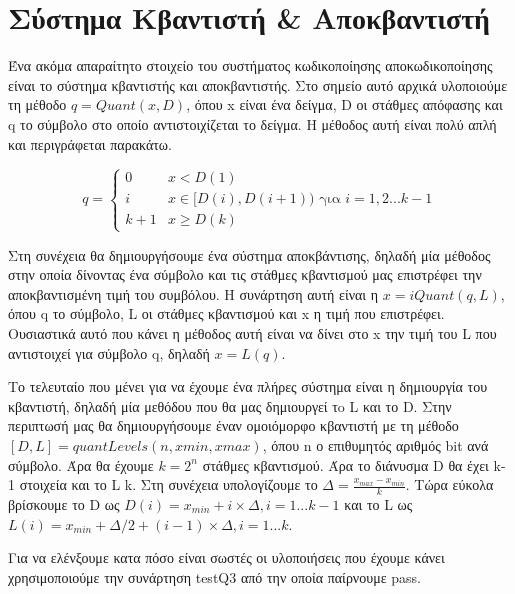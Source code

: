 \section{Σύστημα Κβαντιστή \& Αποκβαντιστή}

\par Ένα ακόμα απαραίτητο στοιχείο του συστήματος κωδικοποίησης αποκωδικοποίησης
είναι το σύστημα κβαντιστής και αποκβαντιστής. Στο σημείο αυτό αρχικά υλοποιούμε
τη μέθοδο $q = Quant(x, D)$, όπου x είναι ένα δείγμα, D οι στάθμες απόφασης και q
το σύμβολο στο οποίο αντιστοιχίζεται το δείγμα. Η μέθοδος αυτή είναι πολύ απλή και
περιγράφεται παρακάτω.


\begin{equation}
q =
\begin{cases}
0  &    x < D(1) \\
i  & x\in[D(i), D(i+1)) \mbox{ για }  i = 1,2...k-1 \\
k+1 & x \geq D(k)
\end{cases}
\end{equation}

\par Στη συνέχεια θα δημιουργήσουμε ένα σύστημα αποκβάντισης, δηλαδή μία μέθοδος
στην οποία δίνοντας ένα σύμβολο και τις στάθμες κβαντισμού μας επιστρέφει την
αποκβαντισμένη τιμή του συμβόλου. Η συνάρτηση αυτή είναι η $x = iQuant(q, L)$, όπου
q το σύμβολο, L οι στάθμες κβαντισμού και x η τιμή που επιστρέφει. Ουσιαστικά αυτό
που κάνει η μέθοδος αυτή είναι να δίνει στο x την τιμή του L που αντιστοιχεί για
σύμβολο q, δηλαδή $x = L(q)$.

\par Το τελευταίο που μένει για να έχουμε ένα πλήρες σύστημα είναι η δημιουργία
του κβαντιστή, δηλαδή μία μεθόδου που θα μας δημιουργεί τo L και το D. Στην
περιπτωσή μας θα δημιουργήσουμε έναν ομοιόμορφο κβαντιστή με τη μέθοδο $[D, L] =
quantLevels(n, xmin, xmax)$, όπου n ο επιθυμητός αριθμός bit ανά σύμβολο. Άρα
θα έχουμε $k = 2^n$ στάθμες κβαντισμού. Άρα το διάνυσμα D θα έχει k-1 στοιχεία
και το L k. Στη συνέχεια υπολογίζουμε το $\Delta = \frac{x_{max}-x_{min}}{k}$.
Τώρα εύκολα βρίσκουμε το D ως $D(i)=x_{min}+i \times \Delta, i=1...k-1$ και το
L ως $L(i) = x_{min} + \Delta/2 + (i-1)\times\Delta, i = 1...k$.

\par Για να ελένξουμε κατα πόσο είναι σωστές οι υλοποιήσεις που έχουμε κάνει χρησιμοποιούμε
την συνάρτηση testQ3 από την οποία παίρνουμε pass.

